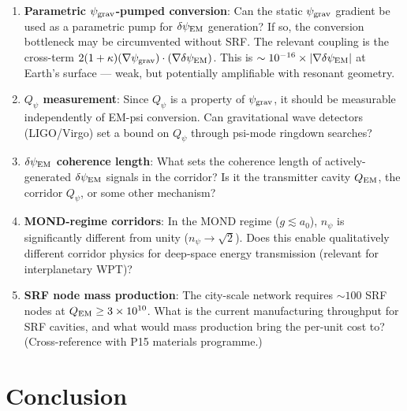\documentclass[11pt]{article}
\newcommand{\ee}[1]{\times 10^{#1}}
\newcommand{\psigrav}{\psi_{\rm grav}}
\newcommand{\dpsiEM}{\delta\psi_{\rm EM}}
\newcommand{\Qpsi}{Q_\psi}
\newcommand{\npsi}{n_\psi}
\begin{document}
\begin{enumerate}
\item \textbf{Parametric $\psigrav$-pumped conversion}: Can the static
  $\psigrav$ gradient be used as a parametric pump for $\dpsiEM$
  generation? If so, the conversion bottleneck may be circumvented
  without SRF. The relevant coupling is the cross-term
  $2(1+\kappa)(\nabla\psigrav)\cdot(\nabla\dpsiEM)$. This is
  $\sim 10^{-16}\times|\nabla\dpsiEM|$ at Earth's surface ---
  weak, but potentially amplifiable with resonant geometry.

\item \textbf{$\Qpsi$ measurement}: Since $\Qpsi$ is a property of
  $\psigrav$, it should be measurable independently of EM-psi conversion.
  Can gravitational wave detectors (LIGO/Virgo) set a bound on $\Qpsi$
  through psi-mode ringdown searches?

\item \textbf{$\dpsiEM$ coherence length}: What sets the coherence
  length of actively-generated $\dpsiEM$ signals in the corridor?
  Is it the transmitter cavity $Q_{\rm EM}$, the corridor $\Qpsi$,
  or some other mechanism?

\item \textbf{MOND-regime corridors}: In the MOND regime ($g \lesssim a_0$),
  $\npsi$ is significantly different from unity ($\npsi \to \sqrt{2}$).
  Does this enable qualitatively different corridor physics for
  deep-space energy transmission (relevant for interplanetary WPT)?

\item \textbf{SRF node mass production}: The city-scale network
  requires $\sim 100$ SRF nodes at $Q_{\rm EM} \geq 3\ee{10}$.
  What is the current manufacturing throughput for SRF cavities,
  and what would mass production bring the per-unit cost to?
  (Cross-reference with P15 materials programme.)
\end{enumerate}

\section{Conclusion}
\label{sec:conclusion}
\end{document}
